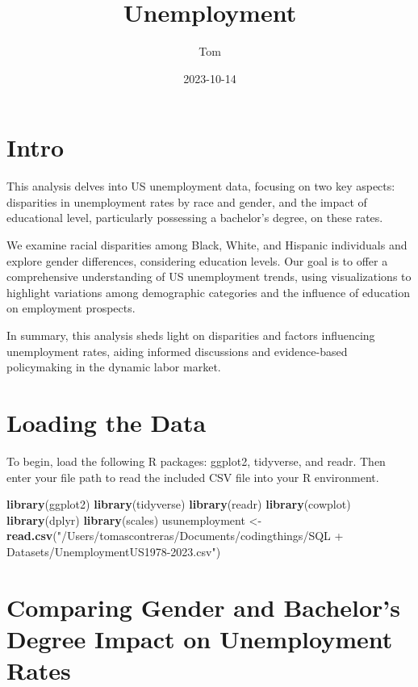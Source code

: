 \documentclass[
]{article}
\title{Unemployment}
\author{Tom}
\date{2023-10-14}
\newenvironment{Shaded}{\begin{snugshade}}{\end{snugshade}}
\newcommand{\FunctionTok}[1]{\textcolor[rgb]{0.13,0.29,0.53}{\textbf{#1}}}
\newcommand{\NormalTok}[1]{#1}
\newcommand{\OtherTok}[1]{\textcolor[rgb]{0.56,0.35,0.01}{#1}}
\newcommand{\StringTok}[1]{\textcolor[rgb]{0.31,0.60,0.02}{#1}}
\begin{document}
\maketitle

\hypertarget{intro}{%
\section{Intro}\label{intro}}

This analysis delves into US unemployment data, focusing on two key
aspects: disparities in unemployment rates by race and gender, and the
impact of educational level, particularly possessing a bachelor's
degree, on these rates.

We examine racial disparities among Black, White, and Hispanic
individuals and explore gender differences, considering education
levels. Our goal is to offer a comprehensive understanding of US
unemployment trends, using visualizations to highlight variations among
demographic categories and the influence of education on employment
prospects.

In summary, this analysis sheds light on disparities and factors
influencing unemployment rates, aiding informed discussions and
evidence-based policymaking in the dynamic labor market.

\hypertarget{loading-the-data}{%
\section{Loading the Data}\label{loading-the-data}}

To begin, load the following R packages: ggplot2, tidyverse, and readr.
Then enter your file path to read the included CSV file into your R
environment.

\begin{Shaded}
\begin{Highlighting}[]
\FunctionTok{library}\NormalTok{(ggplot2)}
\FunctionTok{library}\NormalTok{(tidyverse)}
\FunctionTok{library}\NormalTok{(readr)}
\FunctionTok{library}\NormalTok{(cowplot)}
\FunctionTok{library}\NormalTok{(dplyr)}
\FunctionTok{library}\NormalTok{(scales)}
\NormalTok{usunemployment }\OtherTok{\textless{}{-}} \FunctionTok{read.csv}\NormalTok{(}\StringTok{"/Users/tomascontreras/Documents/codingthings/SQL + Datasets/UnemploymentUS1978{-}2023.csv"}\NormalTok{)}
\end{Highlighting}
\end{Shaded}

\hypertarget{comparing-gender-and-bachelors-degree-impact-on-unemployment-rates}{%
\section{Comparing Gender and Bachelor's Degree Impact on Unemployment
Rates}\label{comparing-gender-and-bachelors-degree-impact-on-unemployment-rates}}
\end{document}
